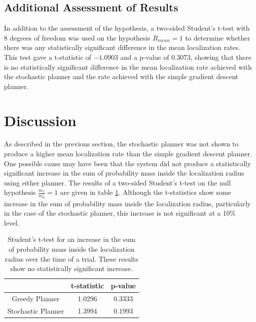\documentclass[submit, 12pt]{aiaa-pretty-modified}
\begin{document}
\subsection{Additional Assessment of Results}
\label{sec:additional}
In addition to the assessment of the hypothesis, a two-sided Student's
t-test with 8 degrees of freedom was used on the hypothesis $R_{mean}
= 1$ to determine whether there was any statistically significant
difference in the mean localization rates.  This test gave
a t-statistic of $-1.0903$ and a p-value of $0.3073$, showing that
there is no statistically significant difference in the mean localization
rate achieved with the stochastic planner and the rate achieved with
the simple gradient descent planner.

\section{Discussion}
As described in the previous section, the stochastic planner was not
shown to produce a higher mean localization
rate than the simple gradient descent planner.  One possible cause may
have been
that the system did not produce a statistically significant increase
in the sum of probability mass inside the localization radius using
either planner.  The results of a two-sided Student's t-test on the
null hypothesis $\frac{m_f}{m_0} = 1$ are given in table
\ref{tab:nofind}.  Although the t-statistics show some increase in the
sum of probability mass inside the localization radius,
particularly in the case of the stochastic planner, this increase is
not significant at a 10\% level.

\begin{table}[htb]
\begin{center}
\begin{tabular}{|c||c|c|}
\hline
& t-statistic & p-value \\
\hline \hline
Greedy Planner & 1.0296 & 0.3333\\
\hline
Stochastic Planner& 1.3994 &0.1993\\
\hline
\end{tabular}
\caption[Student's t-test on probability mass increase inside
localization radius.]{Student's t-test for an increase in the sum of probability
  mass inside the localization radius over the time of a trial.
  These results show no statistically significant increase. \label{tab:nofind} }
\end{center}
\end{table}
\end{document}

